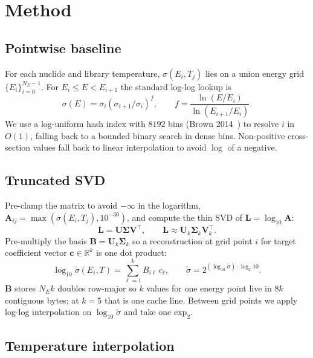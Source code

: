 \section{Method}
\label{sec:method}

\subsection{Pointwise baseline}

For each nuclide and library temperature, $\sigma(E_i, T_j)$
lies on a union energy grid $\{E_i\}_{i=0}^{N_E - 1}$. For
$E_i \leq E < E_{i+1}$ the standard log-log lookup is
\begin{equation}
\sigma(E) = \sigma_i
\left(\sigma_{i+1}/\sigma_i\right)^{f},
\qquad
f = \frac{\ln(E/E_i)}{\ln(E_{i+1}/E_i)}.
\label{eq:loglog}
\end{equation}
We use a log-uniform hash index with $8192$ bins
(Brown 2014~\cite{brown2014hash}) to resolve $i$ in $O(1)$,
falling back to a bounded binary search in dense bins.
Non-positive cross-section values fall back to linear
interpolation to avoid $\log$ of a negative.

\subsection{Truncated SVD}

Pre-clamp the matrix to avoid $-\infty$ in the logarithm,
$\mathbf{A}_{ij} = \max(\sigma(E_i, T_j), 10^{-30})$, and
compute the thin SVD of $\mathbf{L} = \log_{10}\mathbf{A}$:
\begin{equation}
\mathbf{L} = \mathbf{U} \boldsymbol{\Sigma} \mathbf{V}^\top,
\qquad
\mathbf{L} \approx \mathbf{U}_k \boldsymbol{\Sigma}_k
\mathbf{V}_k^\top.
\end{equation}
Pre-multiply the basis $\mathbf{B} = \mathbf{U}_k
\boldsymbol{\Sigma}_k$ so a reconstruction at grid point $i$
for target coefficient vector $\mathbf{c} \in \mathbb{R}^k$ is
one dot product:
\begin{equation}
\log_{10}\tilde\sigma(E_i, T)
= \sum_{\ell = 1}^{k} B_{i\ell}\, c_\ell,
\qquad
\tilde\sigma = 2^{(\log_{10}\tilde\sigma)\cdot\log_2 10}.
\label{eq:svd_eval}
\end{equation}
$\mathbf{B}$ stores $N_E k$ doubles row-major so $k$ values
for one energy point live in $8k$ contiguous bytes; at $k=5$
that is one cache line. Between grid points we apply log-log
interpolation on $\log_{10}\tilde\sigma$ and take one
$\mathrm{exp}_2$.

\subsection{Temperature interpolation}
\label{sec:ducru}

